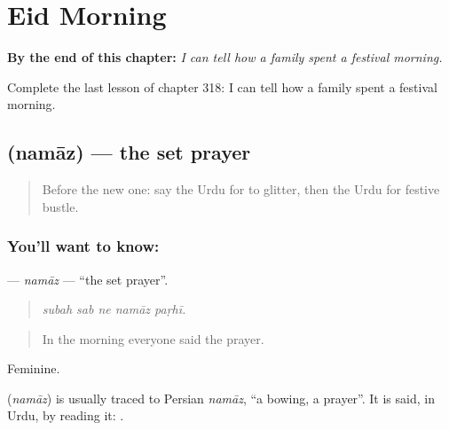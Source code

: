
\chapter{Eid Morning}
\label{ch:ur-eid-morning}

\begin{chapteropening}
\textbf{By the end of this chapter:} \emph{I can tell how a family spent a festival morning.}

Complete the last lesson of chapter 318: I can tell how a family spent a festival morning.
\end{chapteropening}

\section[\texorpdfstring{\ur{نماز} (namāz)}{نماز (namāz)}]{ (namāz) — the set prayer}

\label{lesson:UR-C318-namaz}



\begin{quote}
Before the new one: say the Urdu for to glitter, then the Urdu for festive bustle.
\end{quote}

\subsection*{You'll want to know: }
\textbf{} — \emph{namāz} — \textquotedblleft{}the set prayer\textquotedblright{}.

\begin{quote}
    
\end{quote}

\begin{quote}
\emph{subah sab ne namāz paṛhī.}
\end{quote}

\begin{quote}
In the morning everyone said the prayer.
\end{quote}

Feminine.

\begin{cousinweb}
\textbf{} (\emph{namāz}) is usually traced to Persian \emph{namāz}, \textquotedblleft{}a bowing, a prayer\textquotedblright{}. It is said, in Urdu, by reading it: \textbf{ }.
\end{cousinweb}

